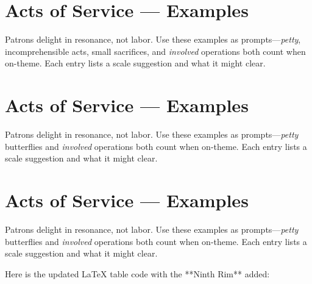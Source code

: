 
\section{Acts of Service — Examples}\label{sec:acts-of-service-table}

Patrons delight in resonance, not labor. Use these examples as prompts—\emph{petty}, incomprehensible acts, small sacrifices,  and \emph{involved} operations both count when on-theme. Each entry lists a scale suggestion and what it might clear.


\section{Acts of Service — Examples}\label{sec:acts-of-service-table}

Patrons delight in resonance, not labor. Use these examples as prompts—\emph{petty} butterflies and \emph{involved} operations both count when on-theme. Each entry lists a scale suggestion and what it might clear.


\section{Acts of Service — Examples}\label{sec:acts-of-service-table}

Patrons delight in resonance, not labor. Use these examples as prompts---\emph{petty} butterflies and \emph{involved} operations both count when on-theme. Each entry lists a scale suggestion and what it might clear.

Here is the updated LaTeX table code with the **Ninth Rim** added:

